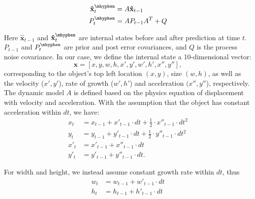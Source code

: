 \begin{align}
\mathbf{\hat{x}}^{\mhyphen}_t & = A\mathbf{\hat{x}}_{t-1} \label{eq:linear-model} \\%
P^\mhyphen_t & = AP_{t-1}A^T + Q \label{eq:predict_noisecov_pre}
\end{align}

Here $\mathbf{\hat{x}}_{t-1}$ and $\mathbf{\hat{x}}^{\mhyphen}_t$ are internal states before and after prediction at time $t$. $P_{t-1}$ and $P^\mhyphen_t$ are prior and post error covariances, and $Q$ is the process noise covariance. In our case, we define 
the internal state a 10-dimensional vector: $$\mathbf{x}=[x, y, w, h, x', y', w', h', x'', y''],$$ corresponding to the object's top left location $(x, y)$, size $(w, h)$, as well as the velocity ($x',y'$), rate of growth ($w',h'$) and acceleration $(x'', y''$), respectively.
The dynamic model $A$ is defined based on the physics equation of displacement with velocity and acceleration. With the assumption that the object has constant acceleration within $dt$, we have:
\begin{align}
  x_t & = x_{t-1} + x'_{t-1}\cdot dt+\tfrac{1}{2}\cdot x''_{t-1}\cdot dt^2 \label{eq:x}\\
  y_t & = y_{t-1} + y'_{t-1}\cdot dt+\tfrac{1}{2}\cdot y''_{t-1}\cdot dt^2 \label{eq:y}\\
  x'_t & = x'_{t-1} + x''_{t-1}\cdot dt \label{eq:xp}\\
  y'_t & = y'_{t-1} + y''_{t-1}\cdot dt \label{eq:yp}.
\end{align}

For width and height, we instead assume constant growth rate within $dt$, thus
\begin{align}
  w_t & = w_{t-1} + w'_{t-1}\cdot dt \label{eq:w}\\
  h_t & = h_{t-1} + h'_{t-1}\cdot dt \label{eq:h}
\end{align} 


